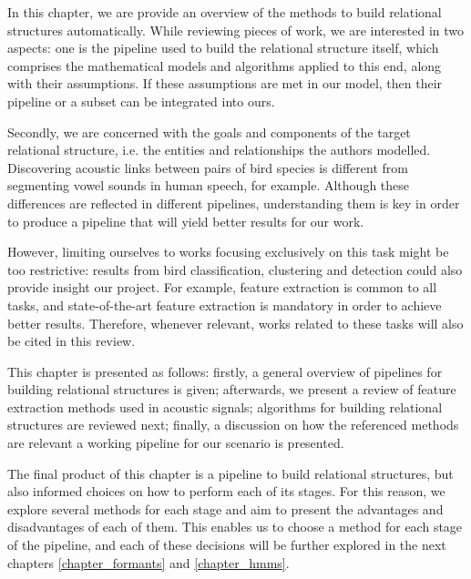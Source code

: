 \documentclass[../main.tex]{subfiles} \label{chapter_soa}
\begin{document}
In this chapter, we are provide an overview of the methods to build relational structures automatically. While reviewing pieces of work, we are interested in two aspects: one is the pipeline used to build the relational structure itself, which comprises the mathematical models and algorithms applied to this end, along with their assumptions. If these assumptions are met in our model, then their pipeline or a subset can be integrated into ours.
\par Secondly, we are concerned with the goals and components of the target relational structure, i.e. the entities and relationships the authors modelled. Discovering acoustic links between pairs of bird species is different from segmenting vowel sounds in human speech, for example. Although these differences are reflected in different pipelines, understanding them is key in order to produce a pipeline that will yield better results for our work.
\par However, limiting ourselves to works focusing exclusively on this task might be too restrictive: results from bird classification, clustering and detection could also provide insight our project. For example, feature extraction is common to all tasks, and state-of-the-art feature extraction is mandatory in order to achieve better results. Therefore, whenever relevant, works related to these tasks will also be cited in this review.
\par This chapter is presented as follows: firstly, a general overview of pipelines for building relational structures is given; afterwards, we present a review of feature extraction methods used in acoustic signals; algorithms for building relational structures are reviewed next; finally, a discussion on how the referenced methods are relevant a working pipeline for our scenario is presented.
\par The final product of this chapter is a pipeline to build relational structures, but also informed choices on how to perform each of its stages. For this reason, we explore several methods for each stage and aim to present the advantages and disadvantages of each of them. This enables us to choose a method for each stage of the pipeline, and each of these decisions will be further explored in the next chapters \ref{chapter_formants} and \ref{chapter_hmms}.
\end{document}
